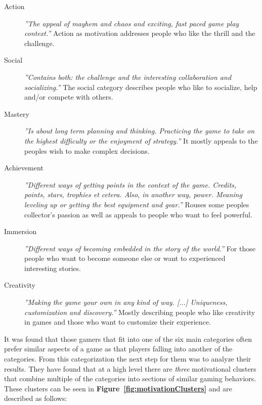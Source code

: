 \begin{description}%
	\item[Action] \textit{''The appeal of mayhem and chaos and exciting, fast paced game play context.''} \newline Action as motivation addresses people who like the thrill and the challenge.
	
	\item[Social] \textit{''Contains both: the challenge and the interesting collaboration and socializing.''} \newline The social category describes people who like to socialize, help and/or compete with others.
	
	\item[Mastery] \textit{''Is about long term planning and thinking. Practicing the game to take on the highest difficulty or the enjoyment of strategy.''} \newline It mostly appeals to the peoples wish to make complex decisions.
	
	\item[Achievement] \textit{''Different ways of getting points in the context of the game. Credits, points, stars, trophies et cetera. Also, in another way, power. Meaning leveling up or getting the best equipment and gear.''} \newline Rouses some peoples collector's passion as well as appeals to people who want to feel powerful.
	
	\item[Immersion] \textit{''Different ways of becoming embedded in the story of the world.''} \newline For those people who want to become someone else or want to experienced interesting stories.
	
	\item[Creativity] \textit{''Making the game your own in any kind of way. [...] Uniqueness, customization and discovery.''} \newline Mostly describing people who like creativity in games and those who want to customize their experience.

\end{description}


It was found that those gamers that fit into one of the six main categories often prefer similar aspects of a game as that players falling into another of the categories. \newline
From this categorization the next step for them was to analyze their results. They have found that at a high level there are \textit{three} motivational clusters that combine multiple of the categories into sections of similar gaming behaviors. These clusters can be seen in \textbf{Figure~\ref{fig:motivationClusters}} and are described as follows:

